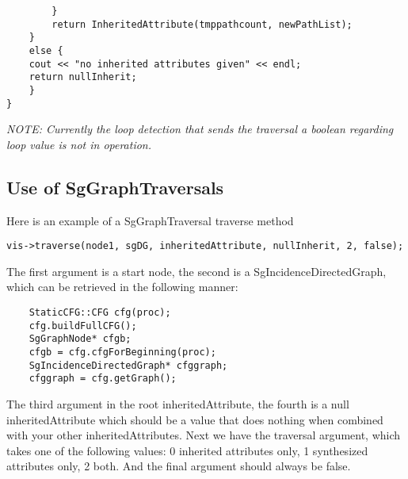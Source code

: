 \begin{verbatim}
        }
        return InheritedAttribute(tmppathcount, newPathList);
    }
    else {
    cout << "no inherited attributes given" << endl;
    return nullInherit;
    }
}
\end{verbatim}
{\em NOTE: Currently the loop detection that sends the traversal a boolean regarding loop value is not in operation.}

\subsection{Use of SgGraphTraversals}
Here is an example of a SgGraphTraversal traverse method
\begin{verbatim}
vis->traverse(node1, sgDG, inheritedAttribute, nullInherit, 2, false);
\end{verbatim}
The first argument is a start node, the second is a SgIncidenceDirectedGraph, which can be retrieved in the following manner:
\begin{verbatim}
    StaticCFG::CFG cfg(proc);
    cfg.buildFullCFG();
    SgGraphNode* cfgb;
    cfgb = cfg.cfgForBeginning(proc);
    SgIncidenceDirectedGraph* cfggraph;
    cfggraph = cfg.getGraph();
\end{verbatim}
The third argument in the root inheritedAttribute, the fourth is a null inheritedAttribute which should be a value
that does nothing when combined with your other inheritedAttributes. Next we have the traversal argument, which takes
one of the following values: 0 inherited attributes only, 1 synthesized attributes only, 2 both. And the final argument should
always be false.

